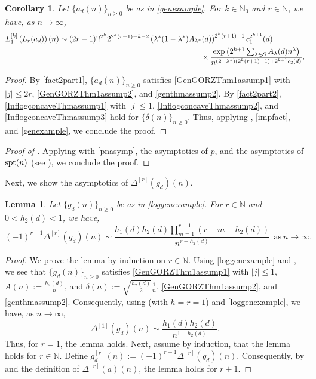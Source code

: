 \documentclass[11pt,reqno,a4paper]{amsart}
\renewcommand{\d}{{\delta}}
\renewcommand{\l}{\lambda}
\renewcommand{\(}{\left\(}
\renewcommand{\)}{\right\)}
\numberwithin{equation}{section}
\theoremstyle{plain}
\newtheorem{lemma}[theorem]{Lemma}
\newtheorem{corollary}[theorem]{Corollary}
\theoremstyle{definition} %
\numberwithin{equation}{section}
\begin{document}
\begin{corollary}\label{itlagthm2}
Let $\{a_d(n)\}_{n\ge 0}$ be as in \eqref{genexample}. For $k\in \mathbb{N}_0$ and $r\in \mathbb{N}$, we have, as $n\to \infty$,
\begin{align*}
L^{[k]}_1\left(L_r(a_d)\right)(n)&\sim (2r-1)!!^{2^k} 2^{2^k(r+1)-k-2}\left(\l^*(1-\l^*)A_{\l^*}(d)\right)^{2^k(r+1)-1} c^{2^{k+1}}_1(d)\\
&\hspace{6.5 cm}\times \frac{\exp\left(2^{k+1}\sum_{\l\in \mathcal{S}}A_{\l}(d)n^{\l}\right)}{n^{\left(2-\l^*\right)\left(2^k(r+1)-1\right)+2^{k+1}c_2(d)}}.
\end{align*}
\end{corollary}
\begin{proof}
 By  \ref{fact2part1}, $\{a_d(n)\}_{n\ge 0}$ satisfies {\rm{\ref{GenGORZThm1assump1}}} with $|j|\le 2r$, {\rm{\ref{GenGORZThm1assump2}}}, and {\rm{\ref{genthmassump2}}}. By  \ref{fact2part2}, \ref{InflogconcaveThmassump1} with $|j|\le 1$, \ref{InflogconcaveThmassump2}, and \ref{InflogconcaveThmassump3} hold for $\{\d(n)\}_{n\ge 0}$. Thus, applying , \eqref{impfact}, and \eqref{genexample}, we conclude the proof.\qedhere 
\end{proof}


\begin{proof}[Proof of ]
 Applying  with \eqref{pnasymp}, the asymptotics of $\overline{p}$, and the asymptotics of $\textup{spt}(n)$ (see \cite{B}), we conclude the proof.\qedhere 
\end{proof}



Next, we show the asymptotics of $\Delta^{[r]}(g_d)(n)$. 

\begin{lemma}\label{logdifflem1}
Let $\{g_d(n)\}_{n\ge 0}$ be as in \eqref{loggenexample}. For $r\in \mathbb{N}$ and $0<h_2(d)<1$, we have,
	\[
		(-1)^{r+1}\Delta^{[r]}(g_d)(n)\sim \frac{h_1(d)h_2(d)\prod_{m=1}^{r-1}\left(r-m-h_2(d)\right)}{n^{r-h_2(d)}}\ \ \text{as}\ n\to \infty.
	\]
\end{lemma}

\begin{proof}
We prove the lemma by induction on $r\in \mathbb{N}$. Using \eqref{loggenexample} and , we see that $\{g_d(n)\}_{n\ge 0}$ satisfies \ref{GenGORZThm1assump1} with $|j|\le 1$, $A(n):=\frac{h_2(d)}{n}$, and  $\d(n):=\sqrt{\frac{h_2(d)}{2}}\frac 1n$, \ref{GenGORZThm1assump2}, and \ref{genthmassump2}. Consequently, using  (with $h=r=1$) and \eqref{loggenexample}, we have, as $n\to \infty$,
	\begin{equation*}%
	\Delta^{[1]}\left(g_d\right)(n)
	\sim \frac{h_1(d)h_2(d)}{n^{1-h_2(d)}}.
	\end{equation*}
 Thus, for $r=1$, the lemma holds. Next, assume by induction, that the lemma holds for $r\in \mathbb{N}$. Define  $g^{[r]}_d(n):=(-1)^{r+1}\Delta^{[r]}\left(g_d\right)(n)$. 
	Consequently, by  and the definition of $\Delta^{[r]}(a)(n)$, the lemma holds for $r+1$.\qedhere
\end{proof}
\end{document}
